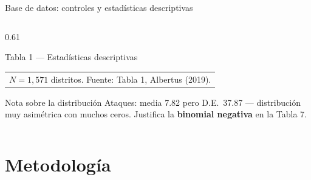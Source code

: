 \documentclass[aspectratio=169,t]{beamer}
\begin{document}
\begin{frame}{Base de datos: controles y estad\'isticas descriptivas}
\begin{columns}[T]
\begin{column}{0.61\textwidth}
\begin{block}{Tabla 1 --- Estad\'isticas descriptivas}
\begin{tabular}{lrrrr}
      \bottomrule
      \multicolumn{5}{l}{\tiny
        $N=1{,}571$ distritos.
        Fuente: Tabla 1, Albertus (2019).}
    \end{tabular}
    \end{block}
    \vspace{0.1cm}
    \begin{alertblock}{\small Nota sobre la distribuci\'on}
    \small Ataques: media 7.82 pero D.E.\ 37.87 ---
    distribuci\'on muy asim\'etrica con muchos ceros.
    Justifica la \textbf{binomial negativa} en
    la Tabla 7.
    \end{alertblock}
  \end{column}
\end{columns}
\end{frame}

\section{Metodolog\'ia}
\end{document}

